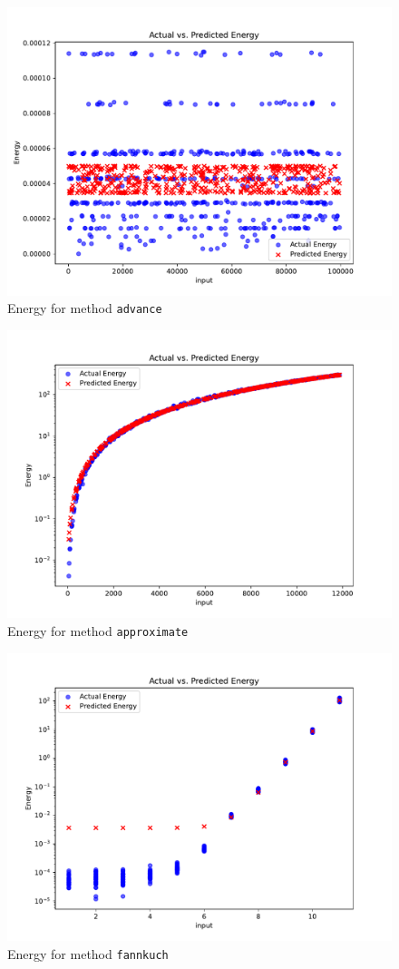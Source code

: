 \begin{figure}[htbp]
  \centering
  \includegraphics[width = .7 \textwidth]{figures/advance_plot.pdf}
  \caption{Energy for method \texttt{advance}}
  \label{fig:advance_plot}
\end{figure}

\begin{figure}[htbp]
  \centering
  \includegraphics[width = .7 \textwidth]{figures/approximate_plot.pdf}
  \caption{Energy for method \texttt{approximate}}
  \label{fig:approximate_plot}
\end{figure}

\begin{figure}[htbp]
  \centering
  \includegraphics[width = .7 \textwidth]{figures/fannkuch_plot.pdf}
  \caption{Energy for method \texttt{fannkuch}}
  \label{fig:fannkuch_plot}
\end{figure}



